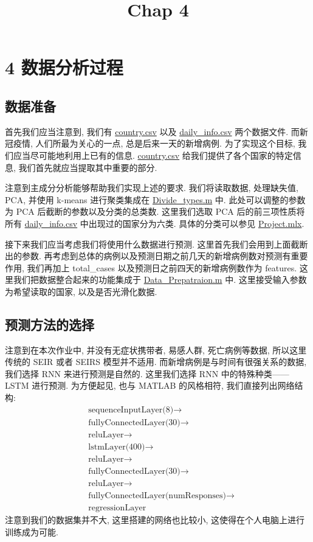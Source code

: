 \documentclass[UTF8]{ctexart}
\title{Chap 4}
\author{}
\date{}
\begin{document}
	\maketitle
    \section*{4 数据分析过程}
    \subsection*{数据准备}
    首先我们应当注意到, 我们有 \href{run:../data/COVID19/country.csv}{country.csv} 以及 \href{run:../data/COVID19/daily\_info.csv}{daily\_info.csv} 两个数据文件. 而新冠疫情, 人们所最为关心的一点, 总是后来一天的新增病例. 为了实现这个目标, 我们应当尽可能地利用上已有的信息. \href{run:../data/COVID19/country.csv}{country.csv} 给我们提供了各个国家的特定信息, 我们首先就应当提取其中重要的部分.

    注意到主成分分析能够帮助我们实现上述的要求. 我们将读取数据, 处理缺失值, PCA, 并使用 k-means 进行聚类集成在 \href{run:../src/Divide\_types.m}{Divide\_types.m} 中. 此处可以调整的参数为 PCA 后截断的参数以及分类的总类数. 这里我们选取 PCA 后的前三项性质将所有 \href{run:../data/COVID19/daily\_info.csv}{daily\_info.csv} 中出现过的国家分为六类. 具体的分类可以参见 \href{run:../Project.mlx}{Project.mlx}.

    接下来我们应当考虑我们将使用什么数据进行预测. 这里首先我们会用到上面截断出的参数. 再考虑到总体的病例以及预测日期之前几天的新增病例数对预测有重要作用, 我们再加上 total\_cases 以及预测日之前四天的新增病例数作为 features. 这里我们把数据整合起来的功能集成于 \href{run:../src/Data\_Prepatraion.m}{Data\_Prepatraion.m} 中. 这里接受输入参数为希望读取的国家, 以及是否光滑化数据.

    \subsection*{预测方法的选择}
    注意到在本次作业中, 并没有无症状携带者, 易感人群, 死亡病例等数据, 所以这里传统的 SEIR 或者 SEIRS 模型并不适用. 而新增病例是与时间有很强关系的数据, 我们选择 RNN 来进行预测是自然的. 这里我们选择 RNN 中的特殊种类——LSTM 进行预测. 为方便起见, 也与 MATLAB 的风格相符, 我们直接列出网络结构:
	\begin{align*}
		&\text{sequenceInputLayer(8)} \rightarrow \\
    	&\text{fullyConnectedLayer(30)} \rightarrow \\
    	&\text{reluLayer} \rightarrow \\
    	&\text{lstmLayer(400)} \rightarrow \\
    	&\text{reluLayer} \rightarrow \\
    	&\text{fullyConnectedLayer(30)} \rightarrow \\
    	&\text{reluLayer} \rightarrow \\
    	&\text{fullyConnectedLayer(numResponses)} \rightarrow \\
    	&\text{regressionLayer}
	\end{align*}
	注意到我们的数据集并不大, 这里搭建的网络也比较小, 这使得在个人电脑上进行训练成为可能.
\end{document}
